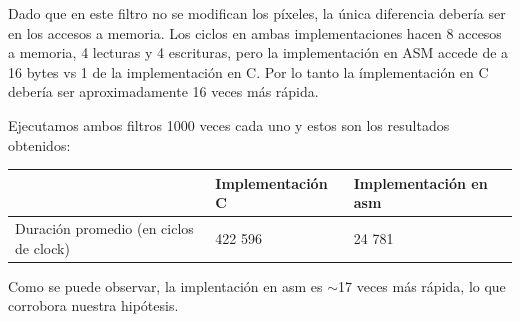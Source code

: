Dado que en este filtro no se modifican los píxeles, la única diferencia debería ser en los accesos a memoria. Los ciclos en ambas implementaciones hacen 8 accesos a memoria, 4 lecturas y 4 escrituras, pero la implementación en ASM accede de a 16 bytes vs 1 de la implementación en C. 
Por lo tanto la ímplementación en C debería ser aproximadamente 16 veces más rápida.

Ejecutamos ambos filtros 1000 veces cada uno y estos son los resultados obtenidos:

\begin{center}
    \begin{tabular}{|l|l|l|}
        \hline
         & Implementación C & Implementación en asm  \\
        \hline
        Duración promedio (en ciclos de clock) & 422 596        & 24 781                 \\
        \hline
    \end{tabular}
\end{center}

Como se puede observar, la implentación en asm es $\sim$17 veces más rápida, lo que corrobora nuestra hipótesis.
